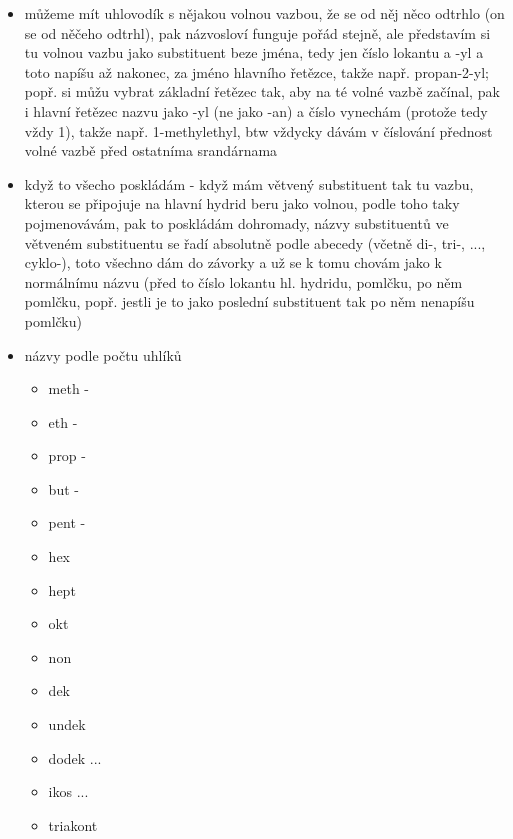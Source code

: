 \documentclass{article}
\begin{document}
\begin{itemize}
\begin{itemize}
\begin{itemize}
      \item můžeme mít uhlovodík s nějakou volnou vazbou, že se od něj něco odtrhlo (on se od něčeho odtrhl), pak názvosloví funguje pořád stejně, ale představím si tu volnou vazbu jako substituent beze jména, tedy jen číslo lokantu a -yl a toto napíšu až nakonec, za jméno hlavního řetězce, takže např. propan-2-yl; popř. si můžu vybrat základní řetězec tak, aby na té volné vazbě začínal, pak i hlavní řetězec nazvu jako -yl (ne jako -an) a číslo vynechám (protože tedy vždy 1), takže např. 1-methylethyl, btw vždycky dávám v číslování přednost volné vazbě před ostatníma srandárnama
      \item když to všecho poskládám - když mám větvený substituent tak tu vazbu, kterou se připojuje na hlavní hydrid beru jako volnou, podle toho taky pojmenovávám, pak to poskládám dohromady, názvy substituentů ve větveném substituentu se řadí absolutně podle abecedy (včetně di-, tri-, ..., cyklo-), toto všechno dám do závorky a už se k tomu chovám jako k normálnímu názvu (před to číslo lokantu hl. hydridu, pomlčku, po něm pomlčku, popř. jestli je to jako poslední substituent tak po něm nenapíšu pomlčku)
      \item názvy podle počtu uhlíků
      \begin{itemize}
        \item meth -
        \item eth  -
        \item prop -
        \item but -
        \item pent -
        \item hex
        \item hept
        \item okt
        \item non
        \item dek
        \item undek
        \item dodek
        ...
        \item ikos
        ...
        \item triakont
      \end{itemize}
    \end{itemize}
  \end{itemize}
\end{itemize}
\end{document}
